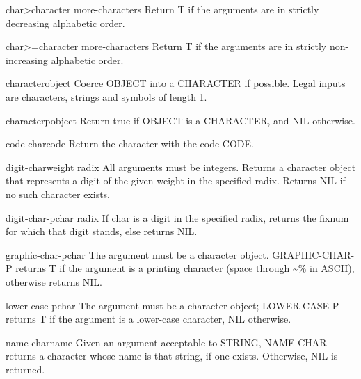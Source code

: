 \begin{function}{char>}{character \rest more-characters}{}{}
  Return T if the arguments are in strictly decreasing alphabetic order.
\end{function}

\begin{function}{char>=}{character \rest more-characters}{}{}
  Return T if the arguments are in strictly non-increasing alphabetic order.
\end{function}

\begin{function}{character}{object}{}{}
  Coerce OBJECT into a CHARACTER if possible. Legal inputs are
  characters, strings and symbols of length 1.
\end{function}

\begin{function}{characterp}{object}{}{}
  Return true if OBJECT is a CHARACTER, and NIL otherwise.
\end{function}

\begin{function}{code-char}{code}{}{}
  Return the character with the code CODE.
\end{function}

\begin{function}{digit-char}{weight \op radix}{}{}
  All arguments must be integers. Returns a character object that
  represents a digit of the given weight in the specified radix. Returns
  NIL if no such character exists.
\end{function}

\begin{function}{digit-char-p}{char \op radix}{}{}
  If char is a digit in the specified radix, returns the fixnum for
  which that digit stands, else returns NIL.
\end{function}

\begin{function}{graphic-char-p}{char}{}{}
  The argument must be a character object. GRAPHIC-CHAR-P returns T if the
  argument is a printing character (space through \~{}\% in ASCII), otherwise
  returns NIL.
\end{function}

\begin{function}{lower-case-p}{char}{}{}
  The argument must be a character object; LOWER-CASE-P returns T if the
   argument is a lower-case character, NIL otherwise.
\end{function}

\begin{function}{name-char}{name}{}{}
  Given an argument acceptable to STRING, NAME-CHAR returns a character
  whose name is that string, if one exists. Otherwise, NIL is returned.
\end{function}

